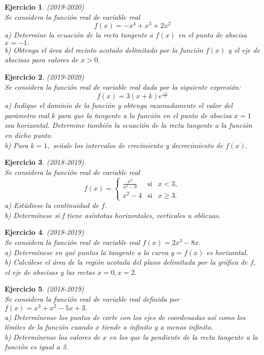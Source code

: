 \documentclass[12pt, a4paper]{amsart}
\newtheorem{ejer}{Ejercicio}
\begin{document}
\begin{ejer}\em (2019-2020)\\
Se considera la función real de variable real
\[f(x)=-x^4+x^3+2x^2\]
a) Determine la ecuación de la recta tangente a $f (x)$ en el punto de abscisa $x =-1.$\\
b) Obtenga el área del recinto acotado delimitado por la función $f(x)$ y el eje de abscisas para valores de $x > 0.$
\end{ejer}

\begin{ejer}\em (2019-2020)\\
Se considera la función real de variable real dada por la siguiente expresión:
\[f(x)=3(x+k)e^{\frac{-x}{2}}\]
a) Indique el dominio de la función y obtenga razonadamente el valor del parámetro real $k$ para que la tangente a la función en el punto de abscisa $x = 1$ sea horizontal. Determine también la ecuación de la recta tangente a
la función en dicho punto.\\
b) Para $k = 1,$ señale los intervalos de crecimiento y decrecimiento de $f (x).$
\end{ejer}

\newpage

\begin{ejer}\em (2018-2019)\\
Se considera la función real de variable real
\[
f(x)=\left \{ \begin{matrix}
\frac{x^3}{x^2-9} & \text{si} & x< 3,\\
x^2-4 & \text{si} & x\geq 3.
\end{matrix}\right.
\]
a) Estúdiese la continuidad de $f.$\\
b) Determínese si f tiene asíntotas horizontales, verticales u oblicuas.
\end{ejer}

\begin{ejer}\em (2018-2019)\\
Se considera la función real de variable real $f (x) = 2x^3 - 8x.$\\
a) Determínese en qué puntos la tangente a la curva $y = f(x)$ es horizontal.\\
b) Calcúlese el área de la región acotada del plano delimitada por la gráfica de $f,$ el eje de abscisas y las rectas $x = 0, x = 2.$
\end{ejer}

\begin{ejer}\em (2018-2019)\\
Se considera la función real de variable real definida por $f(x) = x^3 + x^2 - 5x + 3.$\\
a) Determínense los puntos de corte con los ejes de coordenadas así como los límites de la función cuando $x$ tiende a infinito y a menos infinito.\\
b) Determínense los valores de $x$ en los que la pendiente de la recta tangente a la función es igual a 3.
\end{ejer}
\end{document}
